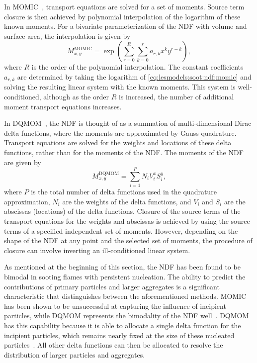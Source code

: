 In MOMIC~\cite{frenklach2002,frenklach1987,frenklach1994}, transport equations are solved for a set of moments. Source term closure is then achieved by polynomial interpolation of the logarithm of these known moments. For a bivariate parameterization of the NDF with volume and surface area, the interpolation is given by
\begin{equation}\label{eq:lesmodels:soot:ndf:momic}
  M_{x,y}^{\text{MOMIC}} = \exp\left( \sum\limits_{r=0}^{R} \sum\limits_{k=0}^{r} a_{r,k}x^k y^{r-k} \right),
\end{equation}
where $R$ is the order of the polynomial interpolation. The constant coefficients $a_{r,k}$ are determined by taking the logarithm of \cref{eq:lesmodels:soot:ndf:momic} and solving the resulting linear system with the known moments. This system is well-conditioned, although as the order $R$ is increased, the number of additional moment transport equations increases.

In DQMOM~\cite{marchisio2005}, the NDF is thought of as a summation of multi-dimensional Dirac delta functions, where the moments are approximated by Gauss quadrature. Transport equations are solved for the weights and locations of these delta functions, rather than for the moments of the NDF. The moments of the NDF are given by
\begin{equation}\label{eq:lesmodels:soot:ndf:dqmom}
  M_{x,y}^{\text{DQMOM}} = \sum\limits_{i=1}^{P} N_i V_i^x S_i^y,
\end{equation}
where $P$ is the total number of delta functions used in the quadrature approximation, $N_i$ are the weights of the delta functions, and $V_i$ and $S_i$ are the abscissas (locations) of the delta functions. Closure of the source terms of the transport equations for the weights and abscissas is achieved by using the source terms of a specified independent set of moments. However, depending on the shape of the NDF at any point and the selected set of moments, the procedure of closure can involve inverting an ill-conditioned linear system.

As mentioned at the beginning of this section, the NDF has been found to be bimodal in sooting flames with persistent nucleation. The ability to predict the contributions of primary particles and larger aggregates is a significant characteristic that distinguishes between the aforementioned methods. MOMIC has been shown to be unsuccessful at capturing the influence of incipient particles, while DQMOM represents the bimodality of the NDF well~\cite{mueller2009}. DQMOM has this capability because it is able to allocate a single delta function for the incipient particles, which remains nearly fixed at the size of these nucleated particles~\cite{blanquart2009}. All other delta functions can then be allocated to resolve the distribution of larger particles and aggregates.

